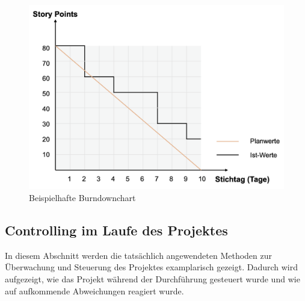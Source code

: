 \documentclass[ThesisDJ.tex]{subfiles}
\begin{document}
    \begin{figure}
        \includegraphics[scale=0.5]{burndown.png}
        \centering
        \caption{Beispielhafte Burndownchart}
        \label{fig:burndown}
    \end{figure}

    \subsection{Controlling im Laufe des Projektes}
    In diesem Abschnitt werden die tatsächlich angewendeten Methoden zur Überwachung und Steuerung des 
    Projektes examplarisch gezeigt. Dadurch wird aufgezeigt, wie das Projekt während der Durchführung gesteuert wurde 
    und wie auf aufkommende Abweichungen reagiert wurde.
\end{document}
